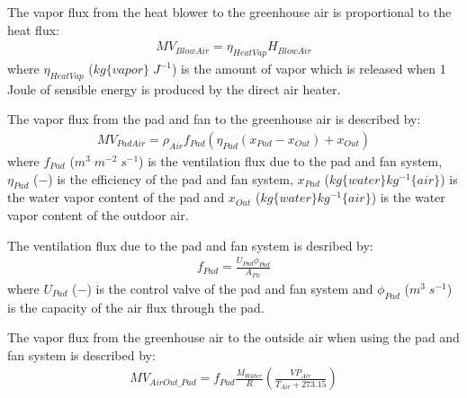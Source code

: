 \documentclass[a4paper]{article}
\begin{document}
The vapor flux from the heat blower to the greenhouse air is proportional to the heat flux:
\begin{align}
  MV_{BlowAir} = \eta_{HeatVap} H_{BlowAir}
\end{align}
where \(\eta_{HeatVap}\) (\(kg\{vapor\}\;J^{-1}\)) is the amount of vapor which is released when 1 Joule of sensible energy is produced by the direct air heater.

The vapor flux from the pad and fan to the greenhouse air is described by:
\begin{align}
  MV_{PadAir} = \rho_{Air} f_{Pad} (\eta_{Pad} (x_{Pad} - x_{Out}) + x_{Out})
\end{align}
where \(f_{Pad}\) (\(m^3\;m^{-2}\;s^{-1}\)) is the ventilation flux due to the pad and fan system, \(\eta_{Pad}\) (\(-\)) is the efficiency of the pad and fan system, \(x_{Pad}\) (\(kg\{water\} kg^{-1}\{air\}\)) is the water vapor content of the pad and \(x_{Out}\) (\(kg\{water\} kg^{-1}\{air\}\)) is the water vapor content of the outdoor air.

The ventilation flux due to the pad and fan system is desribed by:
\begin{align}
  f_{Pad} = \frac{U_{Pad} \phi_{Pad}}{A_{Flr}}
\end{align}
where \(U_{Pad}\) (\(-\)) is the control valve of the pad and fan system and \(\phi_{Pad}\) (\(m^3\;s^{-1}\)) is the capacity of the air flux through the pad.

The vapor flux from the greenhouse air to the outside air when using the pad and fan system is described by:
\begin{align}
  MV_{AirOut\_Pad} = f_{Pad} \frac{M_{Water}}{R} \left(\frac{VP_{Air}}{T_{Air} + 273.15}\right)
\end{align}
\end{document}
